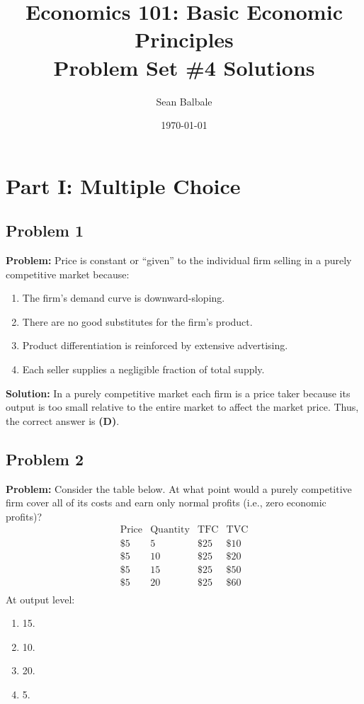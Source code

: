 \documentclass[12pt]{article}
\title{Economics 101: Basic Economic Principles\\Problem Set \#4 Solutions}
\author{Sean Balbale}
\date{\today}
\begin{document}
\maketitle

\section*{Part I: Multiple Choice}

\subsection*{Problem 1}
\textbf{Problem:} Price is constant or “given” to the individual firm selling in a purely competitive market because:
\begin{enumerate}[label=(\Alph*)]
  \item The firm's demand curve is downward-sloping.
  \item There are no good substitutes for the firm's product.
  \item Product differentiation is reinforced by extensive advertising.
  \item Each seller supplies a negligible fraction of total supply.
\end{enumerate}

\textbf{Solution:} In a purely competitive market each firm is a price taker because its output is too small relative to the entire market to affect the market price. Thus, the correct answer is \textbf{(D)}.

\subsection*{Problem 2}
\textbf{Problem:} Consider the table below. At what point would a purely competitive firm cover all of its costs and earn only normal profits (i.e., zero economic profits)?
\[
\begin{array}{cccc}
\text{Price} & \text{Quantity} & \text{TFC} & \text{TVC} \\
\$5 & 5 & \$25 & \$10 \\
\$5 & 10 & \$25 & \$20 \\
\$5 & 15 & \$25 & \$50 \\
\$5 & 20 & \$25 & \$60 \\
\end{array}
\]
At output level:
\begin{enumerate}[label=(\Alph*)]
  \item 15.
  \item 10.
  \item 20.
  \item 5.
\end{enumerate}
\end{document}
